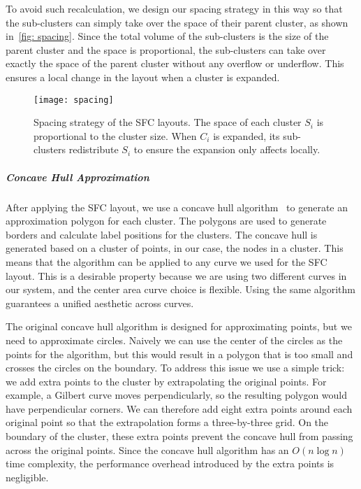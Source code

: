 To avoid such recalculation, we design our spacing strategy in this way so that the sub-clusters can simply take over the space of their parent cluster, as shown in~\autoref{fig: spacing}.
Since the total volume of the sub-clusters is the size of the parent cluster and the space is proportional, the sub-clusters can take over exactly the space of the parent cluster without any overflow or underflow.
This ensures a local change in the layout when a cluster is expanded.
\begin{figure}
 \centering %
 \texttt{[image: spacing]}
 \caption{Spacing strategy of the SFC layouts. The space of each cluster $S_i$ is proportional to the cluster size. When $C_i$ is expanded, its sub-clusters redistribute $S_i$ to ensure the expansion only affects locally. }
\label{fig: spacing}
\end{figure}
\vspace*{-0.3cm}
\subparagraph*{Concave Hull Approximation}
After applying the SFC layout, we use a concave hull algorithm~\cite{park2012concavehull} to generate an approximation polygon for each cluster.
The polygons are used to generate borders and calculate label positions for the clusters.
The concave hull is generated based on a cluster of points, in our case, the nodes in a cluster.
This means that the algorithm can be applied to any curve we used for the SFC layout.
This is a desirable property because we are using two different curves in our system, and the center area curve choice is flexible.
Using the same algorithm guarantees a unified aesthetic across curves.

The original concave hull algorithm is designed for approximating points, but we need to approximate circles.
Naively we can use the center of the circles as the points for the algorithm, but this would result in a polygon that is too small and crosses the circles on the boundary.
To address this issue we use a simple trick: we add extra points to the cluster by extrapolating the original points.
For example, a Gilbert curve moves perpendicularly, so the resulting polygon would have perpendicular corners. 
We can therefore add eight extra points around each original point so that the extrapolation forms a three-by-three grid.
On the boundary of the cluster, these extra points prevent the concave hull from passing across the original points.
Since the concave hull algorithm has an $O(n\log n)$ time complexity, the performance overhead introduced by the extra points is negligible.

